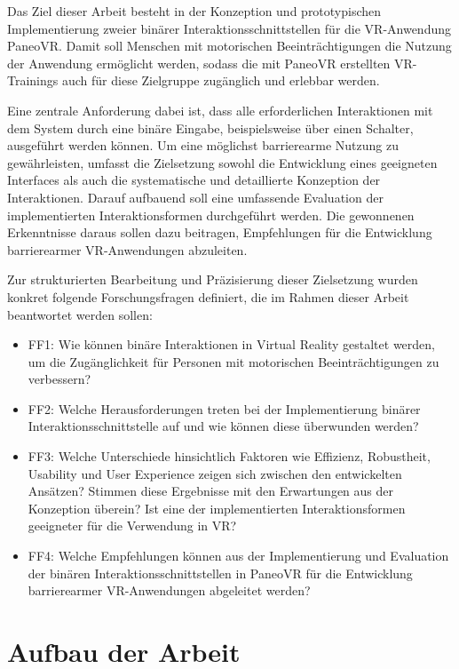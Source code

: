 Das Ziel dieser Arbeit besteht in der Konzeption und prototypischen Implementierung zweier binärer Interaktionsschnittstellen für die VR-Anwendung PaneoVR. Damit soll Menschen mit motorischen Beeinträchtigungen die Nutzung der Anwendung ermöglicht werden, sodass die mit PaneoVR erstellten VR-Trainings auch für diese Zielgruppe zugänglich und erlebbar werden.

Eine zentrale Anforderung dabei ist, dass alle erforderlichen Interaktionen mit dem System durch eine binäre Eingabe, beispielsweise über einen Schalter, ausgeführt werden können. Um eine möglichst barrierearme Nutzung zu gewährleisten, umfasst die Zielsetzung sowohl die Entwicklung eines geeigneten Interfaces als auch die systematische und detaillierte Konzeption der Interaktionen. Darauf aufbauend soll eine umfassende Evaluation der implementierten Interaktionsformen durchgeführt werden. Die gewonnenen Erkenntnisse daraus sollen dazu beitragen, Empfehlungen für die Entwicklung barrierearmer VR-Anwendungen abzuleiten.

Zur strukturierten Bearbeitung und Präzisierung dieser Zielsetzung wurden konkret folgende Forschungsfragen definiert, die im Rahmen dieser Arbeit beantwortet werden sollen:

\begin{itemize}
    \item FF1: Wie können binäre Interaktionen in Virtual Reality gestaltet werden, um die Zugänglichkeit für Personen mit motorischen Beeinträchtigungen zu verbessern?
    \item FF2: Welche Herausforderungen treten bei der Implementierung binärer Interaktionsschnittstelle auf und wie können diese überwunden werden?  
    \item FF3: Welche Unterschiede hinsichtlich Faktoren wie Effizienz, Robustheit, Usability und User Experience zeigen sich zwischen den entwickelten Ansätzen? Stimmen diese Ergebnisse mit den Erwartungen aus der Konzeption überein? Ist eine der implementierten Interaktionsformen geeigneter für die Verwendung in VR?
    \item FF4: Welche Empfehlungen können aus der Implementierung und Evaluation der binären Interaktionsschnittstellen in PaneoVR für die Entwicklung barrierearmer VR-Anwendungen abgeleitet werden?
\end{itemize}
 

\section{Aufbau der Arbeit}

